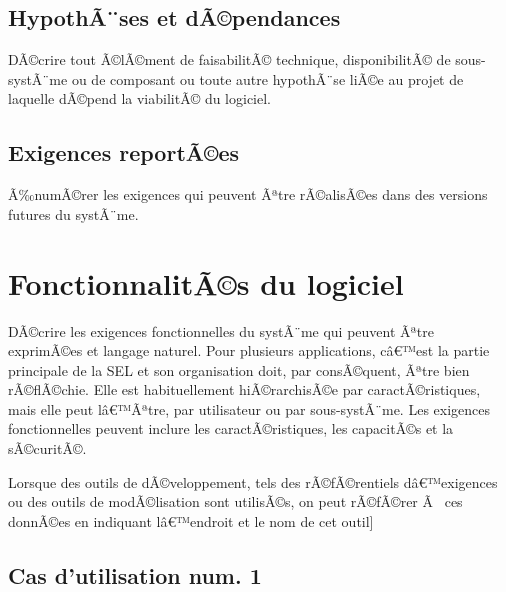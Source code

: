 \documentclass[a4paper, french, 10pt]{report}
\begin{document}
	\subsection{HypothÃ¨ses et dÃ©pendances}
DÃ©crire tout Ã©lÃ©ment de faisabilitÃ© technique, disponibilitÃ© de sous-systÃ¨me ou de composant ou toute autre hypothÃ¨se liÃ©e au projet de laquelle dÃ©pend la viabilitÃ© du logiciel.
	

\subsection{Exigences reportÃ©es}
Ã‰numÃ©rer les exigences qui peuvent Ãªtre rÃ©alisÃ©es dans des versions futures du systÃ¨me.



\section{FonctionnalitÃ©s du logiciel}
DÃ©crire les exigences fonctionnelles du systÃ¨me qui peuvent Ãªtre exprimÃ©es et langage naturel. Pour plusieurs applications, câ€™est la partie principale de la SEL et son organisation doit, par consÃ©quent, Ãªtre bien rÃ©flÃ©chie. Elle est habituellement hiÃ©rarchisÃ©e par caractÃ©ristiques, mais elle peut lâ€™Ãªtre, par utilisateur ou par sous-systÃ¨me. Les exigences fonctionnelles peuvent inclure les caractÃ©ristiques, les capacitÃ©s et la sÃ©curitÃ©.

Lorsque des outils de dÃ©veloppement, tels des rÃ©fÃ©rentiels dâ€™exigences ou des outils de modÃ©lisation sont utilisÃ©s, on peut rÃ©fÃ©rer Ã  ces donnÃ©es en indiquant lâ€™endroit et le nom de cet outil]

	\subsection{Cas d'utilisation num. 1}
\end{document}
